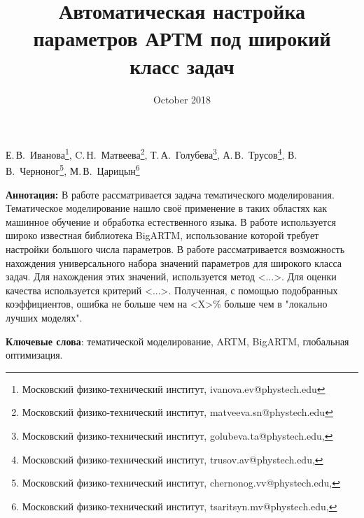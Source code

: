 \documentclass{article}
\date{October 2018}
\begin{document}
\title{Автоматическая настройка параметров АРТМ под широкий класс задач}
\date{}
\maketitle
\begin{center}
   {Е.\,В.~Иванова\footnote{Московский физико-технический институт, ivanova.ev@phystech.edu},
   C.\,Н.~Матвеева\footnote{Московский физико-технический институт, matveeva.sn@phystech.edu},
   Т.\,А.~Голубева\footnote{Московский физико-технический институт, golubeva.ta@phystech.edu,},
   А.\,В.~Трусов\footnote{Московский физико-технический институт, trusov.av@phystech.edu,},
   В.\,В.~Черноног\footnote{Московский физико-технический институт, chernonog.vv@phystech.edu,},
   М.\,В.~Царицын\footnote{Московский физико-технический институт, tsaritsyn.mv@phystech.edu,}
   }
\end{center}


\textbf{Аннотация:} В работе рассматривается задача тематического моделирования. Тематическое моделирование нашло своё применение в таких областях как машинное обучение и обработка естественного языка. В работе используется широко известная библиотека BigARTM, использование которой требует настройки большого числа параметров. В работе рассматривается возможность нахождения универсального набора значений параметров для широкого класса задач. Для нахождения этих значений, используется метод <...>. Для оценки качества используется критерий <...>. Полученная, с помощью подобранных коэффициентов, ошибка не больше чем на <X>\% больше чем в "локально лучших моделях".


\bigskip
\textbf{Ключевые слова}: тематической моделирование, ARTM, BigARTM, глобальная оптимизация.
\end{document}
